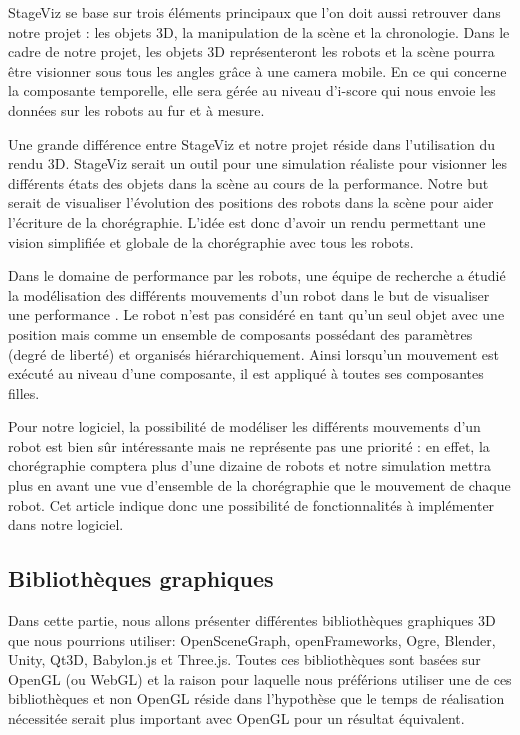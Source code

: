 StageViz se base sur trois éléments principaux que l'on doit aussi retrouver dans notre projet : les objets 3D, la manipulation de la scène et la chronologie. Dans le cadre de notre projet, les objets 3D représenteront les robots et la scène pourra être visionner sous tous les angles grâce à une camera mobile. En ce qui concerne la composante temporelle, elle sera gérée au niveau d'i-score qui nous envoie les données sur les robots au fur et à mesure. 

Une grande différence entre StageViz et notre projet réside dans l'utilisation du rendu 3D. StageViz serait un outil pour une simulation réaliste pour visionner les différents états des objets dans la scène au cours de la performance. Notre but serait de visualiser l'évolution des positions des robots dans la scène pour aider l'écriture de la chorégraphie. L'idée est donc d'avoir un rendu permettant une vision simplifiée et globale de la chorégraphie avec tous les robots.

Dans le domaine de performance par les robots, une équipe de recherche a étudié la modélisation des différents mouvements d'un robot dans le but de visualiser une performance \cite{robotArt}. Le robot n'est pas considéré en tant qu'un seul objet avec une position mais comme un ensemble de composants possédant des paramètres (degré de liberté) et organisés hiérarchiquement. Ainsi lorsqu'un mouvement est exécuté au niveau d'une composante, il est appliqué à toutes ses composantes filles.

Pour notre logiciel, la possibilité de modéliser les différents mouvements d'un robot est bien sûr intéressante mais ne représente pas une priorité : en effet, la chorégraphie comptera plus d'une dizaine de robots et notre simulation mettra plus en avant une vue d'ensemble de la chorégraphie que le mouvement de chaque robot. Cet article indique donc une possibilité de fonctionnalités à implémenter dans notre logiciel.

\subsection{Bibliothèques graphiques}
Dans cette partie, nous allons présenter différentes bibliothèques graphiques 3D que nous pourrions utiliser: OpenSceneGraph, openFrameworks, Ogre, Blender, Unity, Qt3D, Babylon.js et Three.js. Toutes ces bibliothèques sont basées sur OpenGL (ou WebGL) et la raison pour laquelle nous préférions utiliser une de ces bibliothèques et non OpenGL réside dans l'hypothèse que le temps de réalisation nécessitée serait plus important avec OpenGL pour un résultat équivalent.


